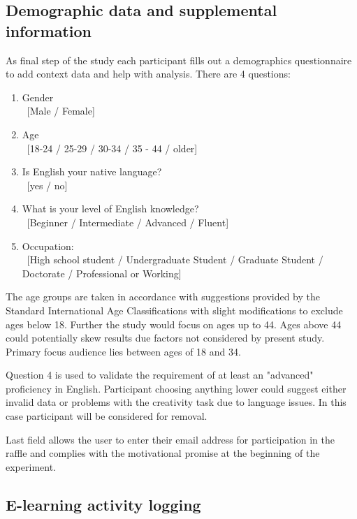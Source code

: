 	\subsection{Demographic data and supplemental information} \label{sec:demographics}
	
	As final step of the study each participant fills out a demographics questionnaire to add context data and help with analysis. There are 4 questions:
	
	\begin{enumerate}
		\item Gender \\ \ [Male / Female]
		\item Age \\ \ [18-24 / 25-29 / 30-34 / 35 - 44 / older]
		\item Is English your native language? \\ \ [yes / no]
		\item What is your level of English knowledge? \\ \
			[Beginner  / Intermediate / Advanced / Fluent]
		\item Occupation: \\ \ [High school student / Undergraduate Student / Graduate Student / Doctorate / Professional or Working]
	\end{enumerate}

	The age groups are taken in accordance with suggestions provided by the Standard International Age Classifications \cite{UN1982} with slight modifications to exclude ages below 18. Further the study would focus on ages up to 44. Ages above 44 could potentially skew results due factors not considered by present study. Primary focus audience lies between ages of 18 and 34.
	
	Question 4 is used to validate the requirement of at least an "advanced" proficiency in English. Participant choosing anything lower could suggest either invalid data or problems with the creativity task due to language issues. In this case participant will be considered for removal. 
	
	Last field allows the user to enter their email address for participation in the raffle and complies with the motivational promise at the beginning of the experiment.

	\subsection{E-learning activity logging} \label{sec:activitylog}
	
